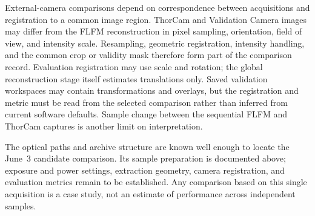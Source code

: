 External-camera comparisons depend on correspondence between acquisitions
and registration to a common image region. ThorCam and Validation Camera
images may differ from the FLFM reconstruction in pixel sampling,
orientation, field of view, and intensity scale. Resampling, geometric
registration, intensity handling, and the common crop or validity mask
therefore form part of the comparison record. Evaluation registration may use
scale and
rotation; the global reconstruction stage itself estimates translations only.
Saved validation workspaces may contain transformations and overlays, but the
registration and metric must be read from the selected comparison rather than
inferred from current software defaults. Sample change between the sequential
FLFM and ThorCam captures is another limit on interpretation.

The optical paths and archive structure are known well enough to locate the
June~3 candidate comparison. Its sample preparation is documented above;
exposure and power settings, extraction geometry, camera registration, and
evaluation metrics remain to be established. Any comparison based on this
single acquisition is a case study, not an estimate of performance across
independent samples.
